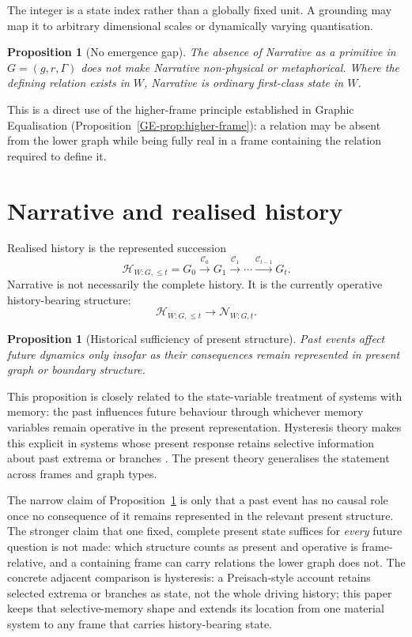 \documentclass[11pt,a4paper]{article}
\newtheorem{proposition}[definition]{Proposition}
\theoremstyle{remark}
\newcommand{\Narr}{\mathcal N}
\newcommand{\Hist}{\mathcal H}
\begin{document}
The integer is a state index rather than a globally fixed unit. A grounding may map it to arbitrary dimensional scales or dynamically varying quantisation.

\begin{proposition}[No emergence gap]\label{prop:no-emergence-gap}
The absence of Narrative as a primitive in $G=(g,r,\Gamma)$ does not make Narrative non-physical or metaphorical. Where the defining relation exists in $W$, Narrative is ordinary first-class state in $W$.
\end{proposition}

This is a direct use of the higher-frame principle established in Graphic Equalisation (Proposition~\ref{GE-prop:higher-frame}): a relation may be absent from the lower graph while being fully real in a frame containing the relation required to define it.

\section{Narrative and realised history}\label{sec:history}
Realised history is the represented succession
\[
\Hist_{W:G,\le t}=G_0\xrightarrow{\mathcal C_0}G_1\xrightarrow{\mathcal C_1}\cdots\xrightarrow{\mathcal C_{t-1}}G_t.
\]
Narrative is not necessarily the complete history. It is the currently operative history-bearing structure:
\[
\Hist_{W:G,\le t}\longrightarrow\Narr_{W:G,t}.
\]

\begin{proposition}[Historical sufficiency of present structure]\label{prop:historical-sufficiency}
Past events affect future dynamics only insofar as their consequences remain represented in present graph or boundary structure.
\end{proposition}

This proposition is closely related to the state-variable treatment of systems with memory: the past influences future behaviour through whichever memory variables remain operative in the present representation. Hysteresis theory makes this explicit in systems whose present response retains selective information about past extrema or branches \citep{mayergoyz1991,mayergoyz2003}. The present theory generalises the statement across frames and graph types.

The narrow claim of Proposition~\ref{prop:historical-sufficiency} is only that a past event has no
causal role once no consequence of it remains represented in the relevant present structure. The
stronger claim that one fixed, complete present state suffices for \emph{every} future question is
not made: which structure counts as present and operative is frame-relative, and a containing frame
can carry relations the lower graph does not. The concrete adjacent comparison is hysteresis: a
Preisach-style account retains selected extrema or branches as state, not the whole driving history;
this paper keeps that selective-memory shape and extends its location from one material system to any
frame that carries history-bearing state.
\end{document}
